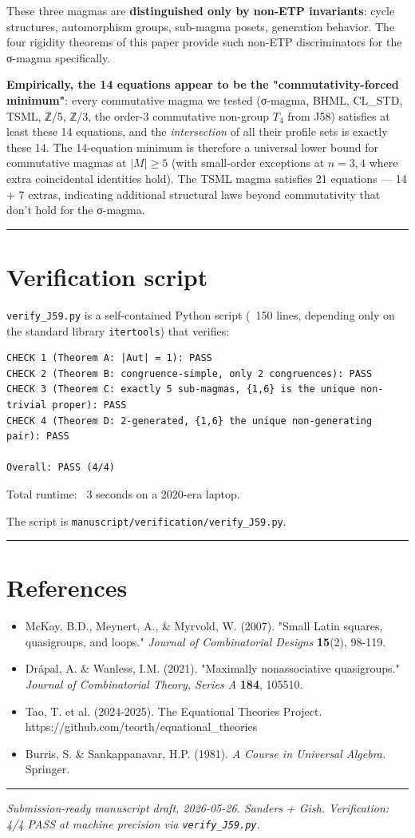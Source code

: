 \documentclass[11pt,reqno]{amsart}
\theoremstyle{plain}
\theoremstyle{definition}
\begin{document}
These three magmas are \textbf{distinguished only by non-ETP invariants}: cycle structures, automorphism groups, sub-magma posets, generation behavior. The four rigidity theorems of this paper provide such non-ETP discriminators for the σ-magma specifically.

\textbf{Empirically, the 14 equations appear to be the "commutativity-forced minimum"}: every commutative magma we tested (σ-magma, BHML, CL_STD, TSML, ℤ/5, ℤ/3, the order-3 commutative non-group $T_4$ from J58) satisfies at least these 14 equations, and the \textit{intersection} of all their profile sets is exactly these 14. The 14-equation minimum is therefore a universal lower bound for commutative magmas at $|M| \geq 5$ (with small-order exceptions at $n = 3, 4$ where extra coincidental identities hold). The TSML magma satisfies 21 equations --- 14 + 7 extras, indicating additional structural laws beyond commutativity that don't hold for the σ-magma.

\medskip\hrule\medskip

\section{Verification script}

\texttt{verify_J59.py} is a self-contained Python script (~150 lines, depending only on the standard library \texttt{itertools}) that verifies:

\begin{verbatim}
CHECK 1 (Theorem A: |Aut| = 1): PASS
CHECK 2 (Theorem B: congruence-simple, only 2 congruences): PASS
CHECK 3 (Theorem C: exactly 5 sub-magmas, {1,6} is the unique non-trivial proper): PASS
CHECK 4 (Theorem D: 2-generated, {1,6} the unique non-generating pair): PASS

Overall: PASS (4/4)
\end{verbatim}

Total runtime: ~3 seconds on a 2020-era laptop.

The script is \texttt{manuscript/verification/verify_J59.py}.

\medskip\hrule\medskip

\section{References}

\begin{itemize}
\item McKay, B.D., Meynert, A., \& Myrvold, W. (2007). "Small Latin squares, quasigroups, and loops." \textit{Journal of Combinatorial Designs} \textbf{15}(2), 98-119.
\item Drápal, A. \& Wanless, I.M. (2021). "Maximally nonassociative quasigroups." \textit{Journal of Combinatorial Theory, Series A} \textbf{184}, 105510.
\item Tao, T. et al. (2024-2025). The Equational Theories Project. https://github.com/teorth/equational_theories
\item Burris, S. \& Sankappanavar, H.P. (1981). \textit{A Course in Universal Algebra.} Springer.
\end{itemize}

\medskip\hrule\medskip

\textit{Submission-ready manuscript draft, 2026-05-26. Sanders + Gish. Verification: 4/4 PASS at machine precision via \texttt{verify_J59.py}.}
\end{document}
